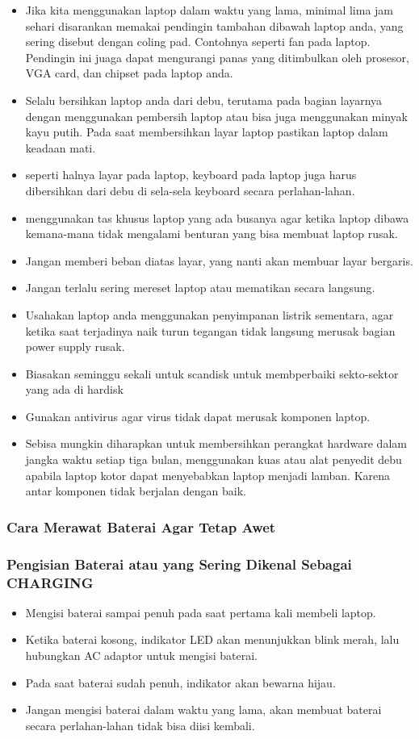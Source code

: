 \begin{itemize}	
	\item Jika kita menggunakan laptop dalam waktu yang lama, minimal lima jam sehari disarankan memakai pendingin tambahan dibawah 
laptop anda, yang sering disebut dengan coling pad. Contohnya seperti fan pada laptop. Pendingin ini juaga dapat mengurangi panas 
yang ditimbulkan oleh prosesor, VGA card, dan chipset pada laptop anda.
	\item Selalu bersihkan laptop anda dari debu, terutama pada bagian layarnya dengan menggunakan pembersih laptop atau bisa juga
menggunakan minyak kayu putih. Pada saat membersihkan layar laptop pastikan laptop dalam keadaan mati.
	\item seperti halnya layar pada laptop, keyboard pada laptop juga harus dibersihkan dari debu di sela-sela keyboard secara 
perlahan-lahan.
	\item menggunakan tas khusus laptop yang ada busanya agar ketika laptop dibawa kemana-mana tidak mengalami benturan yang bisa
membuat laptop rusak.
	\item Jangan memberi beban diatas layar, yang nanti akan membuar layar bergaris.
	\item Jangan terlalu sering mereset laptop atau mematikan secara langsung.
	\item Usahakan laptop anda menggunakan penyimpanan listrik sementara, agar ketika saat terjadinya naik turun tegangan tidak
langsung merusak bagian power supply rusak.
	\item Biasakan seminggu sekali untuk scandisk untuk membperbaiki sekto-sektor yang ada di hardisk
	\item Gunakan antivirus agar virus tidak dapat merusak komponen laptop.
	\item Sebisa mungkin diharapkan untuk membersihkan perangkat hardware dalam jangka waktu setiap tiga bulan, menggunakan kuas atau
alat penyedit debu apabila laptop kotor dapat menyebabkan laptop menjadi lamban. Karena antar komponen tidak berjalan dengan
baik.
\end{itemize}

\subsubsection{Cara Merawat Baterai Agar Tetap Awet}
	\subsubsection{Pengisian Baterai atau yang Sering Dikenal Sebagai CHARGING}
	\begin{itemize}
		\item Mengisi baterai sampai penuh pada saat pertama kali membeli laptop.
		\item Ketika baterai kosong, indikator LED akan menunjukkan blink merah, lalu hubungkan AC adaptor untuk mengisi
		baterai.
		\item Pada saat baterai sudah penuh, indikator akan bewarna hijau.
		\item Jangan mengisi baterai dalam waktu yang lama, akan membuat baterai secara perlahan-lahan tidak bisa diisi kembali.
	\end{itemize}
